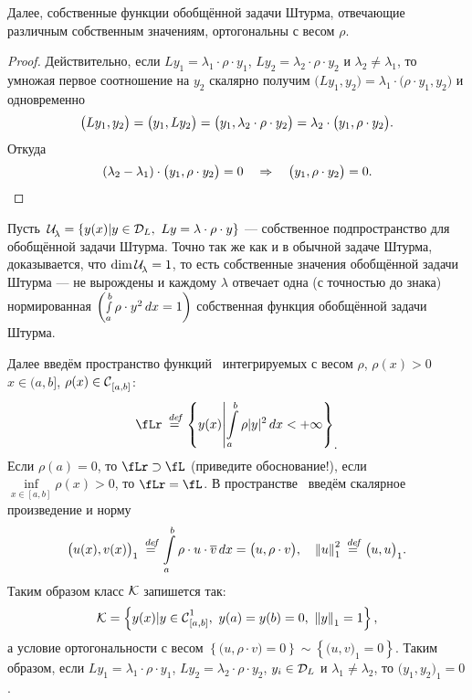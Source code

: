 Далее, собственные функции обобщённой задачи Штурма, отвечающие различным собственным значениям, ортогональны с весом $\rho$. 
\begin{proof}
	Действительно, если $Ly_1=\lambda_1\cdot\rho\cdot y_1$, $Ly_2=\lambda_2\cdot\rho\cdot y_2$ и $\lambda_2\neq\lambda_1$, то умножая первое соотношение на $y_2$ скалярно получим $\big(Ly_1,y_2\big)=\lambda_1\cdot\big(\rho\cdot y_1,y_2\big)$ и одновременно
	\begin{equation}
		\label{l8:eq:3}
		\hfill\big(Ly_1,y_2\big)=\big(y_1,Ly_2\big)=\big(y_1,\lambda_2\cdot\rho\cdot y_2\big)=\lambda_2\cdot\big(y_1,\rho\cdot y_2\big).\hfill
	\end{equation}	
	Откуда 
	\begin{equation}
		\hfill(\lambda_2-\lambda_1)\cdot\big(y_1,\rho\cdot y_2\big)=0\quad\Rightarrow\quad\big(y_1,\rho\cdot y_2\big)=0.\hfill
	\end{equation}
\end{proof}

Пусть\  $\Ul=\left\{y(x)|y\in\mc{D}_L,\ Ly=\lambda\cdot\rho\cdot y\right\}$ --- собственное подпространство для обобщённой задачи Штурма. Точно так же как и в обычной задаче Штурма, доказывается, что $\dim\Ul=1$, то есть собственные значения обобщённой задачи Штурма --- не вырождены и каждому $\lambda$ отвечает одна (с точностью до знака) нормированная $\left(\smallint\limits_a^b\rho\cdot y^2\,dx=1\right)$ собственная функция обобщённой задачи Штурма.

Далее введём пространство функций \fLr\ интегрируемых с весом $\rho$, $\rho(x)>0$ $x\in(a,b]$, $\rho(x)\in\Cfn[{[a,b]}]{}$:
\begin{equation*}
	\hfill\fLr\eqdef\left\{y(x)\middle| \int\limits_a^b\rho|y|^2\,dx<+\infty\right\}_{\displaystyle.}\hfill
\end{equation*}
Если $\rho(a)=0$, то $\fLr\supset\fL$ (приведите обоснование!), если $\displaystyle\inf\limits_{x\in[a,b]}\rho(x)>0$, то $\fLr=\fL$. В пространстве \fLr\ введём скалярное произведение и норму
\begin{equation*}
	\hfill\big(u(x),v(x)\big)_1\eqdef\int\limits_a^b\rho\cdot u\cdot\overline{v}\,dx=\big(u,\rho\cdot v\big),\quad{\norm{u}}_1^2\eqdef\big(u,u\big)_1.\hfill
\end{equation*}
Таким образом класс $\K$ запишется так:
\begin{equation*}
	\hfill\K=\left\{y(x)|y\in\Cfn[{[a,b]}]{1},\ y(a)=y(b)=0,\ \norm{y}_1=1\right\},\hfill
\end{equation*}
а условие ортогональности с весом $\left\{\big(u,\rho\cdot v\big)=0\right\}\sim\left\{\big(u,v\big)_1=0\right\}$. Таким образом, если $Ly_1=\lambda_1\cdot\rho\cdot y_1$, $Ly_2=\lambda_2\cdot\rho\cdot y_2$, $y_i\in\mc{D}_L$ и $\lambda_1\neq\lambda_2$, то $\big(y_1,y_2\big)_1=0$.

